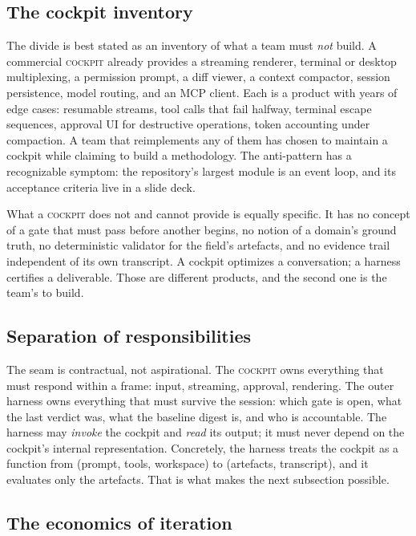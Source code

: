 \documentclass[10pt,a4paper]{article}
\theoremstyle{definition}
\theoremstyle{plain}
\theoremstyle{principle}
\newcommand{\ck}{\textsc{cockpit}}
\begin{document}
\subsection{The cockpit inventory}

The divide is best stated as an inventory of what a team must \emph{not} build. A commercial
\ck{} already provides a streaming renderer, terminal or desktop multiplexing, a permission
prompt, a diff viewer, a context compactor, session persistence, model routing, and an MCP client.
Each is a product with years of edge cases: resumable streams, tool calls that fail halfway,
terminal escape sequences, approval UI for destructive operations, token accounting under
compaction. A team that reimplements any of them has chosen to maintain a cockpit while claiming
to build a methodology. The anti-pattern has a recognizable symptom: the repository's largest
module is an event loop, and its acceptance criteria live in a slide deck.

What a \ck{} does not and cannot provide is equally specific. It has no concept of a gate that
must pass before another begins, no notion of a domain's ground truth, no deterministic validator
for the field's artefacts, and no evidence trail independent of its own transcript. A cockpit
optimizes a conversation; a harness certifies a deliverable. Those are different products, and
the second one is the team's to build.

\subsection{Separation of responsibilities}

The seam is contractual, not aspirational. The \ck{} owns everything that must respond within a
frame: input, streaming, approval, rendering. The outer harness owns everything that must survive
the session: which gate is open, what the last verdict was, what the baseline digest is, and who
is accountable. The harness may \emph{invoke} the cockpit and \emph{read} its output; it must
never depend on the cockpit's internal representation. Concretely, the harness treats the cockpit
as a function from (prompt, tools, workspace) to (artefacts, transcript), and it evaluates only
the artefacts. That is what makes the next subsection possible.

\subsection{The economics of iteration}
\end{document}
